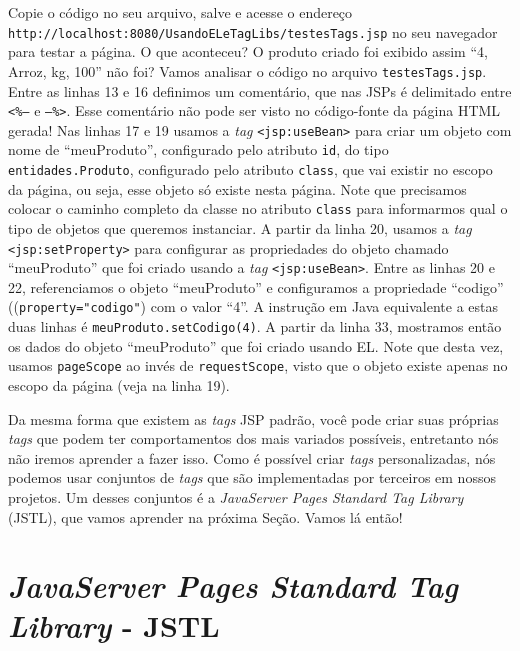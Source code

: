 
Copie o código no seu arquivo, salve e acesse o endereço \texttt{http://localhost:8080/UsandoELeTagLibs/testesTags.jsp} no seu navegador para testar a página. O que aconteceu? O produto criado foi exibido assim ``4, Arroz, kg, 100'' não foi? Vamos analisar o código no arquivo \texttt{testesTags.jsp}. Entre as linhas 13 e 16 definimos um comentário, que nas JSPs é delimitado entre \texttt{<\%--} e \texttt{--\%>}. Esse comentário não pode ser visto no código-fonte da página HTML gerada! Nas linhas 17 e 19 usamos a \textit{tag} \texttt{<jsp:useBean>} para criar um objeto com nome de ``meuProduto'', configurado pelo atributo \texttt{id}, do tipo \texttt{entidades.Produto}, configurado pelo atributo \texttt{class}, que vai existir no escopo da página, ou seja, esse objeto só existe nesta página. Note que precisamos colocar o caminho completo da classe no atributo \texttt{class} para informarmos qual o tipo de objetos que queremos instanciar. A partir da linha 20, usamos a \textit{tag} \texttt{<jsp:setProperty>} para configurar as propriedades do objeto chamado ``meuProduto'' que foi criado usando a \textit{tag} \texttt{<jsp:useBean>}. Entre as linhas 20 e 22, referenciamos o objeto ``meuProduto'' e configuramos a propriedade ``codigo'' ((\texttt{property="codigo"}) com o valor ``4''. A instrução em Java equivalente a estas duas linhas é \texttt{meuProduto.setCodigo(4)}. A partir da linha 33, mostramos então os dados do objeto ``meuProduto'' que foi criado usando EL. Note que desta vez, usamos \texttt{pageScope} ao invés de \texttt{requestScope}, visto que o objeto existe apenas no escopo da página (veja na linha 19).

Da mesma forma que existem as \textit{tags} JSP padrão, você pode criar suas próprias \textit{tags} que podem ter comportamentos dos mais variados possíveis, entretanto nós não iremos aprender a fazer isso. Como é possível criar \textit{tags} personalizadas, nós podemos usar conjuntos de \textit{tags} que são implementadas por terceiros em nossos projetos. Um desses conjuntos é a \textit{JavaServer Pages Standard Tag Library} (JSTL), que vamos aprender na próxima Seção. Vamos lá então!



\section{\textit{JavaServer Pages Standard Tag Library} - JSTL}

